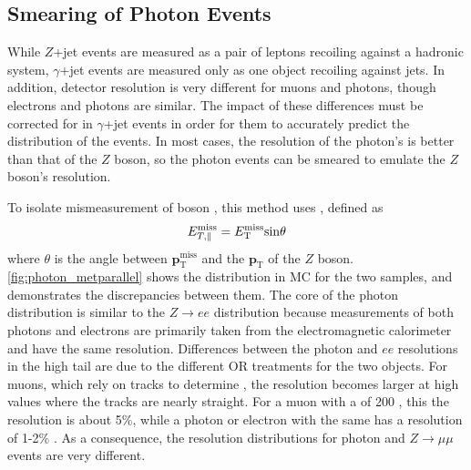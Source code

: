 \subsection{Smearing of Photon Events}
\label{sec:photon_smearing}

While $Z$+jet events are measured as a pair of leptons recoiling against a hadronic system, $\gamma$+jet events are measured only as one  object recoiling against jets. In addition, detector resolution is very different for muons and photons, though electrons and photons are similar. The impact of these differences must be corrected for in $\gamma$+jet events in order for them to accurately predict the \met distribution of the \dyjets events. In most cases, the resolution of the photon's \pt is better than that of the $Z$ boson, so the photon events can be smeared to emulate the $Z$ boson's resolution.  

To isolate mismeasurement of boson \pt, this method uses \metl, defined as
%
\begin{equation}
E_{T,\parallel}^{\mathrm{miss}} = E_{\text{T}}^{\text{miss}} \mathrm{sin} \theta
\end{equation}
%
where $\theta$ is the angle between ${\boldsymbol p}_{\mathrm{T}}^\mathrm{miss}$ and the ${\boldsymbol p}_{\mathrm{T}}$ of the $Z$ boson. \autoref{fig:photon_metparallel} shows the \metl distribution in \ac{MC} for the two samples, and demonstrates the discrepancies between them. The core of the photon distribution is similar to the $Z\rightarrow ee$ distribution because measurements of both photons and electrons are primarily taken from the electromagnetic calorimeter and have the same resolution. Differences between the photon and $ee$ resolutions in the high \metl tail are due to the different \ac{OR} treatments for the two objects. For muons, which rely on tracks to determine \pt, the resolution becomes larger at high \pt values where the tracks are nearly straight. For a muon with a \pt of 200 \gev, this the resolution is about 5\%, while a photon or electron with the same \pt has a resolution of 1-2\% \cite{Aad:2014zya, Aad:2014nim}. As a consequence, the resolution distributions for photon and $Z\rightarrow\mu\mu$ events are very different. 

